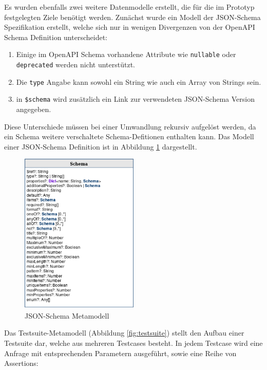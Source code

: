 Es wurden ebenfalls zwei weitere Datenmodelle erstellt, die für die im Prototyp festgelegten Ziele benötigt werden. Zunächst wurde ein Modell der JSON-Schema Spezifikation erstellt, welche sich nur in wenigen Divergenzen von der OpenAPI Schema Definition unterscheidet:

\begin{enumerate}
	\item Einige im OpenAPI Schema vorhandene Attribute wie \lstinline|nullable| oder \lstinline|deprecated| werden nicht unterstützt.
	\item Die \lstinline|type| Angabe kann sowohl ein String wie auch ein Array von Strings sein.
	\item in \lstinline|$schema| wird zusätzlich ein Link zur verwendeten JSON-Schema Version angegeben. 
\end{enumerate}

Diese Unterschiede müssen bei einer Umwandlung rekursiv aufgelöst werden, da ein Schema weitere verschaltete Schema-Defitionen enthalten kann. Das Modell einer JSON-Schema Definition ist in Abbildung \ref{fig:jsonschema} dargestellt. \\

\begin{figure}
\centering
  \includegraphics[width=0.5\textwidth]{../images/json-schema.png}
  \caption{JSON-Schema Metamodell}
  \label{fig:jsonschema}
\end{figure}

Das Testsuite-Metamodell (Abbildung \ref{fig:testsuite}) stellt den Aufbau einer Testsuite dar, welche aus mehreren  Testcases besteht. In jedem Testcase wird eine Anfrage mit entsprechenden Parametern ausgeführt, sowie eine Reihe von Assertions:

